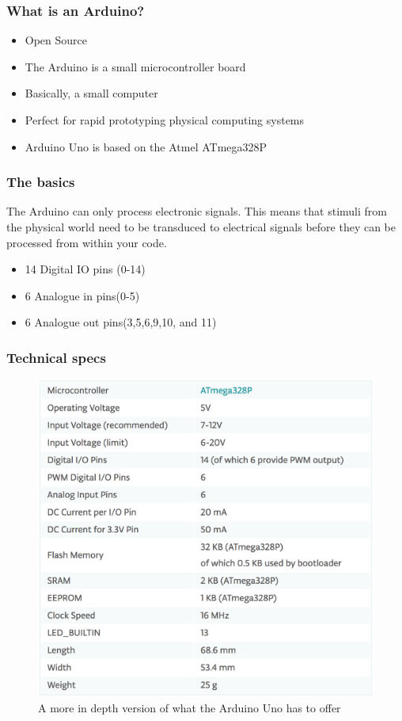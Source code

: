 \begin{frame}
  \frametitle{What is an Arduino?}
  \begin{itemize}
    \item Open Source
    \item The Arduino is a small microcontroller board
    \item Basically, a small computer 
    \item Perfect for rapid prototyping physical computing systems
    \item Arduino Uno is based on the Atmel ATmega328P
  \end{itemize}
\end{frame}



\begin{frame}
  \frametitle{The basics}  
  The Arduino can only process electronic signals. This means that stimuli from the physical world need to be transduced to electrical signals before they can be processed from within your code. 
  
  \begin{itemize}
    \item 14 Digital IO pins (0-14)
    \item 6 Analogue in pins(0-5)
    \item 6 Analogue out pins(3,5,6,9,10, and 11) ~
  \end{itemize}
\end{frame}

\begin{frame}
	\frametitle{Technical specs}
	\begin{figure}
		\includegraphics[scale=.14]{assets/spec} 
		\caption{A more in depth version of what the Arduino Uno has to offer}
	\end{figure}
\end{frame}

